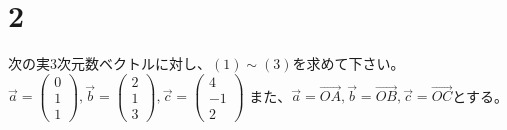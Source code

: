 \documentclass[fleqn]{jsarticle}
\begin{document}
    \section*{2}
    次の実3次元数ベクトルに対し、$(1)\sim(3)$を求めて下さい。\\
    $ \vec{a}
    =
    \left(
        \begin{array}{c}
            0 \\
            1 \\
            1
        \end{array}
    \right)
    ,
    \vec{b}
    =
    \left(
        \begin{array}{c}
            2 \\
            1 \\
            3
        \end{array}
    \right)
    ,
    \vec{c}
    =
    \left(
        \begin{array}{c}
            4 \\
            -1 \\
            2
        \end{array}
    \right) $
    また、$\vec{a}=\vec{OA},\vec{b}=\vec{OB},\vec{c}=\vec{OC}$とする。
\end{document}
